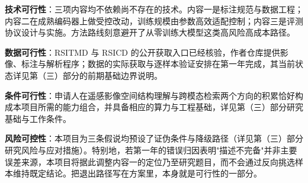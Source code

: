 \textbf{技术可行性}：三项内容均不依赖尚不存在的技术。内容一是标注规范与数据工程；内容二在成熟编码器上做受控改动，训练规模由参数高效适配控制；内容三是评测协议设计与实施。方法路线刻意避开了从零训练大模型这类高风险高成本路径。

\textbf{数据可行性}：RSITMD 与 RSICD 的公开获取入口已经核验，作者仓库提供影像、标注与解析程序；数据的实际获取与逐样本验证安排在第一年完成，其当前状态详见第（三）部分的前期基础边界说明。

\textbf{条件可行性}：申请人在遥感影像空间结构理解与跨模态检索两个方向的积累恰好构成本项目所需的能力组合，并具备相应的算力与工程基础，详见第（三）部分研究基础与工作条件。

\textbf{风险可控性}：本项目为三条假说均预设了证伪条件与降级路径（详见第（三）部分研究风险与应对措施）。特别地，若第一年的错误归因表明"描述不完备"并非主要误差来源，本项目将据此调整内容一的定位乃至研究题目，而不会通过反向挑选样本维持既定结论。把退出路径写在方案里，本身就是可行性的一部分。
